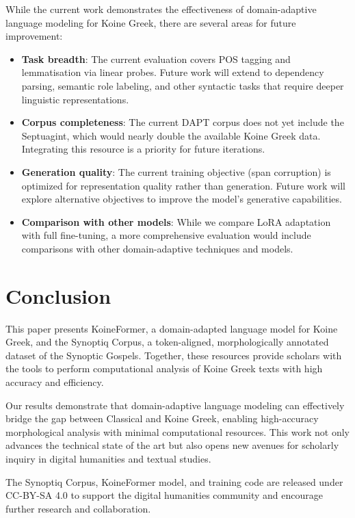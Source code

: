 \documentclass[11pt,letterpaper]{article}
\begin{document}
While the current work demonstrates the effectiveness of domain-adaptive language modeling for Koine Greek, there are several areas for future improvement:
\begin{itemize}
    \item \textbf{Task breadth}: The current evaluation covers POS tagging and lemmatisation via linear probes. Future work will extend to dependency parsing, semantic role labeling, and other syntactic tasks that require deeper linguistic representations.
    \item \textbf{Corpus completeness}: The current DAPT corpus does not yet include the Septuagint, which would nearly double the available Koine Greek data. Integrating this resource is a priority for future iterations.
    \item \textbf{Generation quality}: The current training objective (span corruption) is optimized for representation quality rather than generation. Future work will explore alternative objectives to improve the model's generative capabilities.
    \item \textbf{Comparison with other models}: While we compare LoRA adaptation with full fine-tuning, a more comprehensive evaluation would include comparisons with other domain-adaptive techniques and models.
\end{itemize}

\section{Conclusion}

This paper presents KoineFormer, a domain-adapted language model for Koine Greek, and the Synoptiq Corpus, a token-aligned, morphologically annotated dataset of the Synoptic Gospels. Together, these resources provide scholars with the tools to perform computational analysis of Koine Greek texts with high accuracy and efficiency.

Our results demonstrate that domain-adaptive language modeling can effectively bridge the gap between Classical and Koine Greek, enabling high-accuracy morphological analysis with minimal computational resources. This work not only advances the technical state of the art but also opens new avenues for scholarly inquiry in digital humanities and textual studies.

The Synoptiq Corpus, KoineFormer model, and training code are released under CC-BY-SA 4.0 to support the digital humanities community and encourage further research and collaboration.



\end{document}
